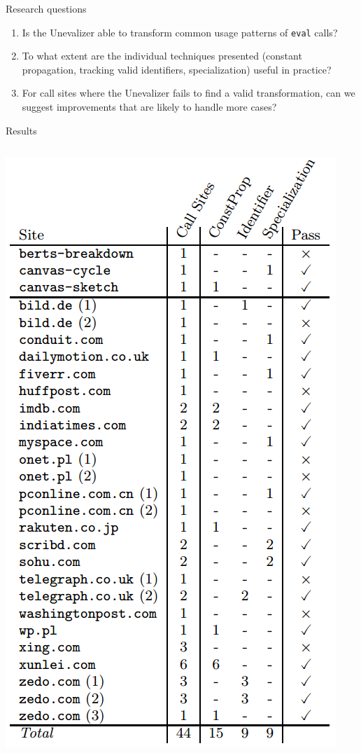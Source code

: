 \documentclass{beamer}
\begin{document}
\begin{frame}{Research questions}
\begin{enumerate}
\item Is the Unevalizer able to transform common usage patterns of
{\tt eval} calls?
\item To what extent are the individual techniques presented (constant
propagation, tracking valid identifiers, specialization) useful in practice?
\item For call sites where the Unevalizer fails to find a valid
transformation, can we suggest improvements that are likely to handle
more cases?
\end{enumerate}
\end{frame}

\begin{frame}{Results}
\begin{columns}[l]
\column{1.5in}
\includegraphics[scale=0.25]{results.png}

\end{columns}
\end{frame}
\end{document}

